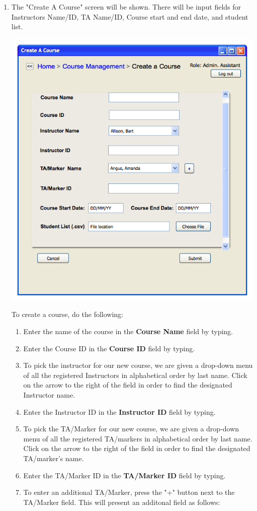 \documentclass{article}
\begin{document}
\begin{enumerate}
\item The "Create A Course" screen will be shown. There will be input fields for Instructors Name/ID, TA Name/ID, Course start and end date, and student list.




\includegraphics[scale=0.55]{../images/UIMockups/pngs/createACourse} 



To create a course, do the following:
	\begin{enumerate}
	\item Enter the name of the course in the \textbf{Course Name} field by typing.
	\item Enter the Course ID in the \textbf{Course ID} field by typing.
	\item To pick the instructor for our new course, we are given a drop-down menu of all the registered Instructors in alphabetical order by last name. Click on the arrow to the right of the field in order to find the designated Instructor name.
	\item Enter the Instructor ID in the \textbf{Instructor ID} field by typing.
	\item To pick the TA/Marker for our new course, we are given a drop-down menu of all the registered TA/markers in alphabetical order by last name. Click on the arrow to the right of the field in order to find the designated TA/marker's name.
	\item Enter the TA/Marker ID in the \textbf{TA/Marker ID} field by typing.
	\item To enter an additional TA/Marker, press the "+" button next to the TA/Marker field. This will present  an additonal field as follows:


\end{enumerate}
\end{enumerate}
\end{document}
